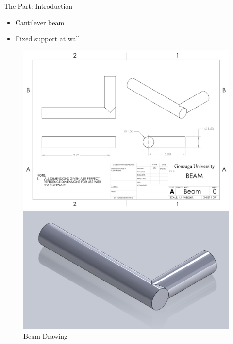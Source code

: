 \documentclass[11pt]{beamer}
\begin{document}
    \begin{frame}{The Part: Introduction}
        \begin{itemize}
            \item Cantilever beam
            \item Fixed support at wall
        \end{itemize}

        \begin{figure}[H]
            \begin{minipage}{.5\textwidth}
                \centering
                \includegraphics[height=0.75\textwidth]{figs/Beam.pdf}
            \end{minipage}%
            \begin{minipage}{.5\textwidth}
                \centering
                \includegraphics[height=0.65\textwidth]{figs/solidworks_isometric_cropped.png}
            \end{minipage}
            \caption{Beam Drawing}
        \end{figure}
    \end{frame}
\end{document}
